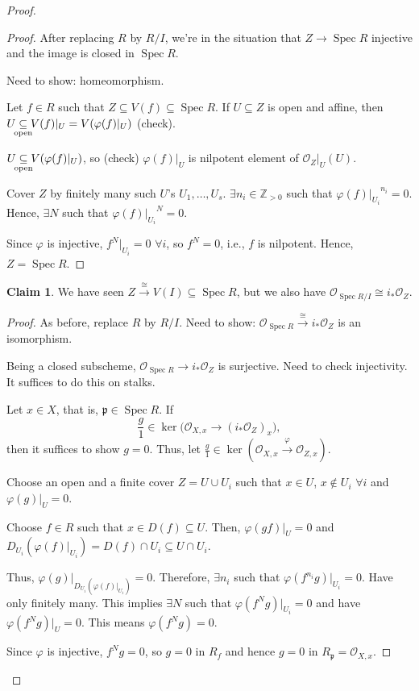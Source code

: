 \documentclass[12pt]{article}
\DeclareMathOperator{\Spec}{Spec}
\theoremstyle{definition}
\newtheorem{claim+}{Claim}
\begin{document}
\begin{proof}
\begin{proof}
After replacing $R$ by $R/I$, we're in the situation that $Z\rightarrow\Spec R$ injective and the image is closed in $\Spec R$.

Need to show: homeomorphism.

Let $f\in R$ such that $Z\subseteq V(f)\subseteq\Spec R$. If $U\subseteq Z$ is open and affine, then $U\underset{\mathclap{\text{open}}}{\subseteq}V(f)|_U=V(\varphi(f)|_U)$ (check).

$U\underset{\mathclap{\text{open}}}{\subseteq}V(\varphi(f)|_U)$, so (check) $\varphi(f)|_U$ is nilpotent element of $\mathcal{O}_Z|_U(U)$.

Cover $Z$ by finitely many such $U$'s $U_1,\ldots,U_s$. $\exists n_i\in\mathbb{Z}_{>0}$ such that ${\varphi(f)|_{U_i}}^{n_i}=0$. Hence, $\exists N$ such that ${\varphi(f)|_{U_i}}^N=0$.

Since $\varphi$ is injective, $f^N|_{U_i}=0$ $\forall i$, so $f^N=0$, i.e., $f$ is nilpotent. Hence, $Z=\Spec R$.
\end{proof}

\begin{claim+}
We have seen $Z\xrightarrow{\cong}V(I)\subseteq\Spec R$, but we also have $\mathcal{O}_{\Spec R/I}\cong i_*\mathcal{O}_Z$.
\end{claim+}

\begin{proof}
As before, replace $R$ by $R/I$. Need to show: $\mathcal{O}_{\Spec R}\xrightarrow{\cong}i_*\mathcal{O}_Z$ is an isomorphism.

Being a closed subscheme, $\mathcal{O}_{\Spec R}\rightarrow i_*\mathcal{O}_Z$ is surjective. Need to check injectivity. It suffices to do this on stalks.

Let $x\in X$, that is, $\mathfrak{p}\in\Spec R$. If
\[\frac{g}{1}\in\ker\big(\mathcal{O}_{X,x}\longrightarrow(i_*\mathcal{O}_Z)_x\big),\]
then it suffices to show $g=0$. Thus, let $\frac{g}{1}\in\ker(\mathcal{O}_{X,x}\xrightarrow{\varphi}\mathcal{O}_{Z,x})$.

Choose an open and a finite cover $Z=U\cup U_i$ such that $x\in U$, $x\notin U_i$ $\forall i$ and $\varphi(g)|_U=0$.

Choose $f\in R$ such that $x\in D(f)\subseteq U$. Then, $\varphi(gf)|_U=0$ and $D_{U_i}(\varphi(f)|_{U_i})=D(f)\cap U_i\subseteq U\cap U_i$.

Thus, $\varphi(g)|_{D_{U_i}(\varphi(f)|_{U_i})}=0$. Therefore, $\exists n_i$ such that $\varphi(f^{n_i}g)|_{U_i}=0$. Have only finitely many. This implies $\exists N$ such that $\varphi(f^Ng)|_{U_i}=0$ and have $\varphi(f^Ng)|_U=0$. This means $\varphi(f^Ng)=0$.

Since $\varphi$ is injective, $f^Ng=0$, so $g=0$ in $R_f$ and hence $g=0$ in $R_{\mathfrak{p}}=\mathcal{O}_{X,x}$.
\end{proof}
\end{proof}
\end{document}
